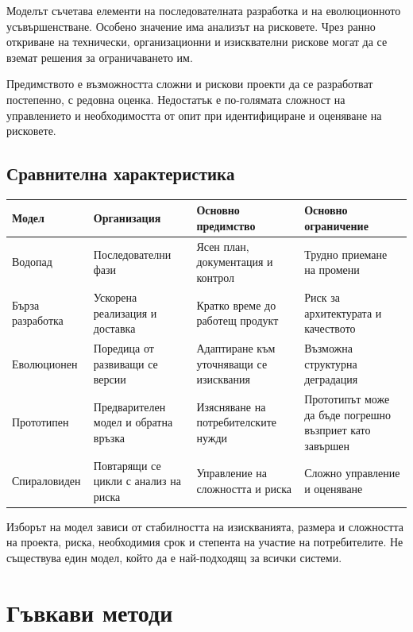 Моделът съчетава елементи на последователната разработка и на еволюционното усъвършенстване. Особено значение има анализът на рисковете. Чрез ранно откриване на технически, организационни и изисквателни рискове могат да се вземат решения за ограничаването им.

Предимството е възможността сложни и рискови проекти да се разработват постепенно, с редовна оценка. Недостатък е по-голямата сложност на управлението и необходимостта от опит при идентифициране и оценяване на рисковете.

\subsection{Сравнителна характеристика}\label{s:26.3.6}

\begin{center}
\begin{tabular}{|p{}|p{}|p{}|p{}|}
\hline
\textbf{Модел} & \textbf{Организация} & \textbf{Основно предимство} & \textbf{Основно ограничение}\\
\hline
Водопад & Последователни фази & Ясен план, документация и контрол & Трудно приемане на промени\\
\hline
Бърза разработка & Ускорена реализация и доставка & Кратко време до работещ продукт & Риск за архитектурата и качеството\\
\hline
Еволюционен & Поредица от развиващи се версии & Адаптиране към уточняващи се изисквания & Възможна структурна деградация\\
\hline
Прототипен & Предварителен модел и обратна връзка & Изясняване на потребителските нужди & Прототипът може да бъде погрешно възприет като завършен\\
\hline
Спираловиден & Повтарящи се цикли с анализ на риска & Управление на сложността и риска & Сложно управление и оценяване\\
\hline
\end{tabular}
\end{center}

Изборът на модел зависи от стабилността на изискванията, размера и сложността на проекта, риска, необходимия срок и степента на участие на потребителите. Не съществува един модел, който да е най-подходящ за всички системи.

\section{Гъвкави методи}\label{s:26.4}


